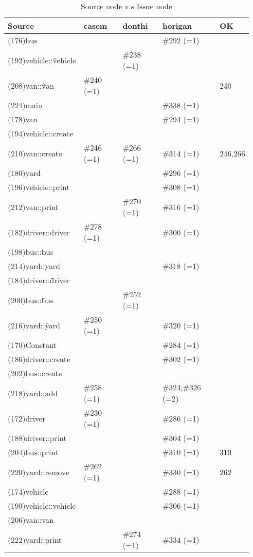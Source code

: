 \begin{table}[hb]
\begin{center}
\begin{tabular}{|l|l|l|l|l|}
\hline
Source & casem & donthi & horigan & OK\\
\hline
(176)bus &  &  & \#292 (=1)& \\
(192)vehicle::\~vehicle &  & \#238 (=1) & & \\
(208)van::\~van & \#240 (=1) &  & & 240\\
(224)main &  &  & \#338 (=1)& \\
(178)van &  &  & \#294 (=1)& \\
(194)vehicle::create &  &  & & \\
(210)van::create & \#246 (=1) & \#266 (=1) & \#314 (=1)& 246,266\\
(180)yard &  &  & \#296 (=1)& \\
(196)vehicle::print &  &  & \#308 (=1)& \\
(212)van::print &  & \#270 (=1) & \#316 (=1)& \\
(182)driver::driver & \#278 (=1) &  & \#300 (=1)& \\
(198)bus::bus &  &  & & \\
(214)yard::yard &  &  & \#318 (=1)& \\
(184)driver::\~driver &  &  & & \\
(200)bus::\~bus &  & \#252 (=1) & & \\
(216)yard::\~yard & \#250 (=1) &  & \#320 (=1)& \\
(170)Constant &  &  & \#284 (=1)& \\
(186)driver::create &  &  & \#302 (=1)& \\
(202)bus::create &  &  & & \\
(218)yard::add & \#258 (=1) &  & \#324,\#326 (=2)& \\
(172)driver & \#230 (=1) &  & \#286 (=1)& \\
(188)driver::print &  &  & \#304 (=1)& \\
(204)bus::print &  &  & \#310 (=1)& 310\\
(220)yard::remove & \#262 (=1) &  & \#330 (=1)& 262\\
(174)vehicle &  &  & \#288 (=1)& \\
(190)vehicle::vehicle &  &  & \#306 (=1)& \\
(206)van::van &  &  & & \\
(222)yard::print &  & \#274 (=1) & \#334 (=1)& \\
\hline
\end{tabular}
\caption{Source node v.s Issue node}
\end{center}
\end{table}

